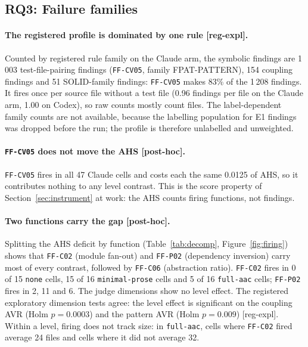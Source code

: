 \documentclass[10pt,a4paper]{article}
\newcommand{\regX}{\textsf{\scriptsize[reg-expl]}}  %
\newcommand{\ph}{\textsf{\scriptsize[post-hoc]}}    %
\newcommand{\ff}[1]{\texttt{\small #1}}
\newcommand{\lev}[1]{\texttt{\small #1}}
\begin{document}
\subsection{RQ3: Failure families}\label{sec:rq3}

\paragraph{The registered profile is dominated by one rule \regX{}.} Counted by registered rule family on the Claude
arm, the symbolic findings are 1\,003 test-file-pairing findings (\ff{FF-CV05}, family FPAT-PATTERN), 154 coupling
findings and 51 SOLID-family findings: \ff{FF-CV05} makes 83\% of the 1\,208 findings.
It fires once per source file without a test file (0.96 findings per file on the Claude arm, 1.00 on Codex), so
raw counts mostly count files. %
The label-dependent family counts are not available, because the labelling population for E1 findings was dropped
before the run; the profile is therefore unlabelled and unweighted. %

\paragraph{\ff{FF-CV05} does not move the AHS \ph{}.} \ff{FF-CV05} fires in all 47 Claude cells and costs each the
same 0.0125 of AHS, so it contributes nothing to any level contrast. %
This is the score property of Section~\ref{sec:instrument} at work: the AHS counts firing functions, not findings.

\paragraph{Two functions carry the gap \ph{}.} Splitting the AHS deficit by function
(Table~\ref{tab:decomp}, Figure~\ref{fig:firing}) shows that \ff{FF-C02} (module fan-out) and \ff{FF-P02}
(dependency inversion) carry most of every contrast, followed by \ff{FF-C06} (abstraction ratio).
\ff{FF-C02} fires in 0 of 15 \lev{none} cells, 15 of 16 \lev{minimal-prose} cells and 5 of 16 \lev{full-aac}
cells; \ff{FF-P02} fires in 2, 11 and 6. %
The judge dimensions show no level effect. %
The registered exploratory dimension tests agree: the level effect is significant on the coupling AVR (Holm
$p = 0.0003$) and the pattern AVR (Holm $p = 0.009$) \regX{}. %
Within a level, firing does not track size: in \lev{full-aac}, cells where \ff{FF-C02} fired average 24 files and
cells where it did not average 32. %
\end{document}
